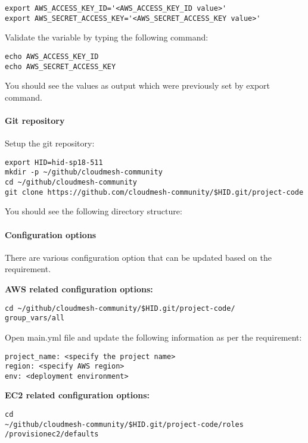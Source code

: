 \begin{verbatim}
export AWS_ACCESS_KEY_ID='<AWS_ACCESS_KEY_ID value>'
export AWS_SECRET_ACCESS_KEY='<AWS_SECRET_ACCESS_KEY value>'
\end{verbatim}

Validate the variable by typing the following command:
\begin{verbatim}
echo AWS_ACCESS_KEY_ID
echo AWS_SECRET_ACCESS_KEY
\end{verbatim}

You should see the values as output which were previously set by export command.

\paragraph{Git repository}

Setup the git repository:

\begin{verbatim}
export HID=hid-sp18-511
mkdir -p ~/github/cloudmesh-community
cd ~/github/cloudmesh-community
git clone https://github.com/cloudmesh-community/$HID.git/project-code
\end{verbatim}

You should see the following directory structure:

\paragraph{Configuration options}

There are various configuration option that can be updated based on
the requirement.

\textbf{AWS related configuration options:}

\begin{verbatim}
cd ~/github/cloudmesh-community/$HID.git/project-code/
group_vars/all
\end{verbatim}

Open main.yml file and update the following information as per the
requirement:

\begin{verbatim}
project_name: <specify the project name>
region: <specify AWS region>
env: <deployment environment>
\end{verbatim}

\textbf{EC2 related configuration options:}

\begin{verbatim}
cd
~/github/cloudmesh-community/$HID.git/project-code/roles
/provisionec2/defaults
\end{verbatim}

